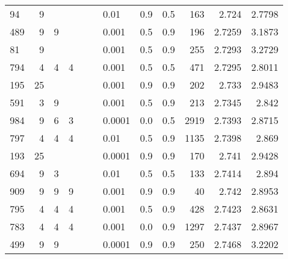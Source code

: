 \begin{longtable}{lrrrrrlrrrrr}
   94 &       9 &   &   &   &   &          0.01 &      0.9 &    0.5 &     163 &      2.724 &        2.7798 \\
  489 &       9 & 9 &   &   &   &         0.001 &      0.5 &    0.9 &     196 &     2.7259 &        3.1873 \\
   81 &       9 &   &   &   &   &         0.001 &      0.5 &    0.9 &     255 &     2.7293 &        3.2729 \\
  794 &       4 & 4 & 4 &   &   &         0.001 &      0.5 &    0.5 &     471 &     2.7295 &        2.8011 \\
  195 &      25 &   &   &   &   &         0.001 &      0.9 &    0.9 &     202 &      2.733 &        2.9483 \\
  591 &       3 & 9 &   &   &   &         0.001 &      0.5 &    0.9 &     213 &     2.7345 &         2.842 \\
  984 &       9 & 6 & 3 &   &   &        0.0001 &      0.0 &    0.5 &    2919 &     2.7393 &        2.8715 \\
  797 &       4 & 4 & 4 &   &   &          0.01 &      0.5 &    0.9 &    1135 &     2.7398 &         2.869 \\
  193 &      25 &   &   &   &   &        0.0001 &      0.9 &    0.9 &     170 &      2.741 &        2.9428 \\
  694 &       9 & 3 &   &   &   &          0.01 &      0.5 &    0.5 &     133 &     2.7414 &         2.894 \\
  909 &       9 & 9 & 9 &   &   &         0.001 &      0.9 &    0.9 &      40 &      2.742 &        2.8953 \\
  795 &       4 & 4 & 4 &   &   &         0.001 &      0.5 &    0.9 &     428 &     2.7423 &        2.8631 \\
  783 &       4 & 4 & 4 &   &   &         0.001 &      0.0 &    0.9 &    1297 &     2.7437 &        2.8967 \\
  499 &       9 & 9 &   &   &   &        0.0001 &      0.9 &    0.9 &     250 &     2.7468 &        3.2202 \\
\end{longtable}
